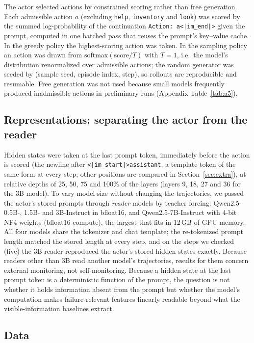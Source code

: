 \documentclass[11pt]{article}
\newcommand{\code}[1]{\texttt{#1}}
\begin{document}
The actor selected actions by constrained scoring rather than free generation. Each admissible action $a$ (excluding \code{help}, \code{inventory} and \code{look})
was scored by the summed log-probability of the continuation \code{Action: a<|im\_end|>} given the prompt, computed in one batched pass that reuses the prompt's key--value cache.
In the greedy policy the highest-scoring action was taken. In the sampling policy an action was drawn from $\mathrm{softmax}(\text{score}/T)$ with $T=1$,
i.e.\ the model's distribution renormalized over admissible actions; the random generator was seeded by (sample seed, episode index, step), so rollouts are reproducible and resumable.
Free generation was not used because small models frequently produced inadmissible actions in preliminary runs (Appendix Table~\ref{tab:a5}).

\subsection{Representations: separating the actor from the reader}
Hidden states were taken at the last prompt token, immediately before the action is scored (the newline after \texttt{<|im\_start|>assistant}, a template token of the same form at every step; other positions are compared in Section~\ref{sec:extra}), at relative depths of 25, 50, 75 and 100\% of the layers
(layers 9, 18, 27 and 36 for the 3B model). To vary model size without changing the trajectories, we passed the actor's stored prompts through \emph{reader} models by teacher forcing:
Qwen2.5-0.5B-, 1.5B- and 3B-Instruct in bfloat16, and Qwen2.5-7B-Instruct with 4-bit NF4 weights (bfloat16 compute), the largest that fits in 12\,GB of GPU memory.
All four models share the tokenizer and chat template; the re-tokenized prompt length matched the stored length at every step, and on the steps we checked (five) the 3B reader reproduced the actor's stored hidden states exactly.
Because readers other than 3B read another model's trajectories, results for them concern external monitoring, not self-monitoring. Because a hidden state at the last prompt token is a deterministic function of the prompt, the question is not whether it holds information absent from the prompt but whether the model's computation makes failure-relevant features linearly readable beyond what the visible-information baselines extract.

\subsection{Data}
\end{document}
